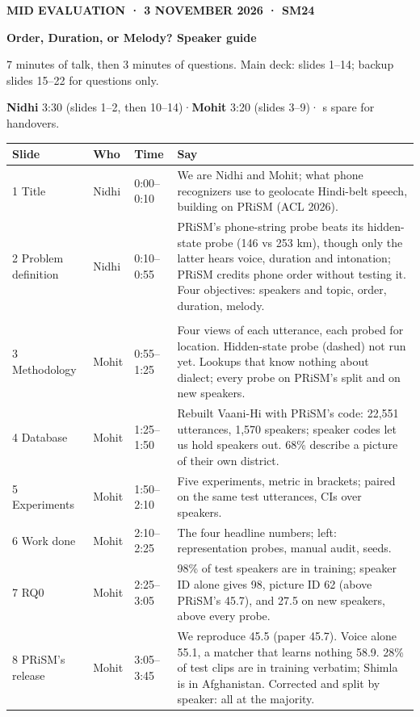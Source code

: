 \documentclass[10pt]{article}
\newcommand{\who}[1]{\textbf{\color{ink}#1}}
\newcommand{\sect}[1]{\par\vspace{5pt}{\serif\bfseries\large\color{ink}#1}\par\vspace{3pt}}
\begin{document}
{\color{kick}\footnotesize\textbf{MID EVALUATION · 3 NOVEMBER 2026 · SM24}}\par
{\serif\bfseries\LARGE\color{ink}Order, Duration, or Melody? Speaker guide}\par\vspace{4pt}
7 minutes of talk, then 3 minutes of questions. Main deck: slides 1--14; backup slides 15--22 for questions only.\par
\who{Nidhi} 3:30 (slides 1--2, then 10--14)\quad·\quad \who{Mohit} 3:20 (slides 3--9)\quad· s spare for handovers.

\sect{Run sheet}
\small
\begin{tabularx}{\linewidth}{@{}>{\raggedright}p{2.75cm} p{1.1cm} p{1.35cm} X@{}}
\toprule
\textbf{Slide} & \textbf{Who} & \textbf{Time} & \textbf{Say} \\
\midrule
1 Title & Nidhi & 0:00--0:10 & We are Nidhi and Mohit; what phone recognizers use to geolocate Hindi-belt speech, building on PRiSM (ACL 2026). \\
2 Problem definition & Nidhi & 0:10--0:55 & PRiSM's phone-string probe beats its hidden-state probe (146 vs 253 km), though only the latter hears voice, duration and intonation; PRiSM credits phone order without testing it. Four objectives: speakers and topic, order, duration, melody. \\
\rowcolor{sage} \multicolumn{4}{@{}l}{\textbf{Handover to Mohit}} \\
3 Methodology & Mohit & 0:55--1:25 & Four views of each utterance, each probed for location. Hidden-state probe (dashed) not run yet. Lookups that know nothing about dialect; every probe on PRiSM's split and on new speakers. \\
4 Database & Mohit & 1:25--1:50 & Rebuilt Vaani-Hi with PRiSM's code: 22,551 utterances, 1,570 speakers; speaker codes let us hold speakers out. 68\% describe a picture of their own district. \\
5 Experiments & Mohit & 1:50--2:10 & Five experiments, metric in brackets; paired on the same test utterances, CIs over speakers. \\
6 Work done & Mohit & 2:10--2:25 & The four headline numbers; left: representation probes, manual audit, seeds. \\
7 RQ0 & Mohit & 2:25--3:05 & 98\% of test speakers are in training; speaker ID alone gives 98, picture ID 62 (above PRiSM's 45.7), and 27.5 on new speakers, above every probe. \\
8 PRiSM's release & Mohit & 3:05--3:45 & We reproduce 45.5 (paper 45.7). Voice alone 55.1, a matcher that learns nothing 58.9. 28\% of test clips are in training verbatim; Shimla is in Afghanistan. Corrected and split by speaker: all at the majority. \\

\end{tabularx}
\end{document}
